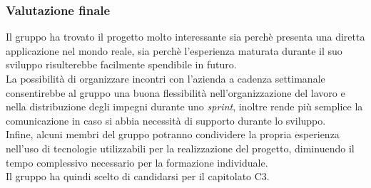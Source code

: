 \subsubsection{Valutazione finale}
Il gruppo ha trovato il progetto molto interessante sia perchè presenta una diretta applicazione nel mondo reale, sia perchè l'esperienza maturata durante il suo sviluppo risulterebbe facilmente spendibile in futuro.\\
La possibilità di organizzare incontri con l'azienda a cadenza settimanale consentirebbe al gruppo una buona flessibilità nell'organizzazione del lavoro e nella distribuzione degli impegni durante uno \textit{sprint}, inoltre rende più semplice la comunicazione in caso si abbia necessità di supporto durante lo sviluppo. \\ 
Infine, alcuni membri del gruppo potranno condividere la propria esperienza nell'uso di tecnologie utilizzabili per la realizzazione del progetto, diminuendo il tempo complessivo necessario per la formazione individuale. \\
Il gruppo ha quindi scelto di candidarsi per il capitolato C3.